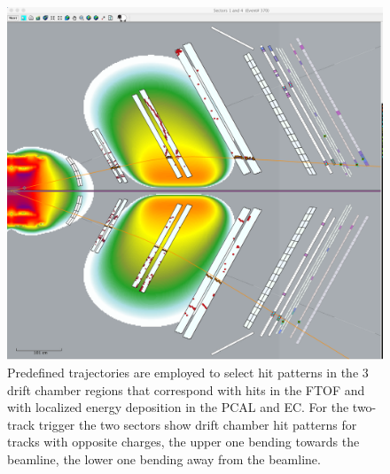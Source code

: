 \documentclass[final,3p,twocolumn]{elsarticle}
\begin{document}
\begin{figure}[htbp!]
\centerline{\includegraphics[width=0.95\columnwidth]{trigger.png}}
\caption{Predefined trajectories are employed to select hit patterns
in the 3 drift chamber regions that correspond with hits in the FTOF and with localized energy deposition in the 
PCAL and EC. For the two-track trigger the two sectors show drift chamber hit patterns for tracks with opposite charges,
 the upper one bending towards the beamline, the lower one bending away from the beamline.  }
\label{trigger}
\end{figure}    
\end{document}
